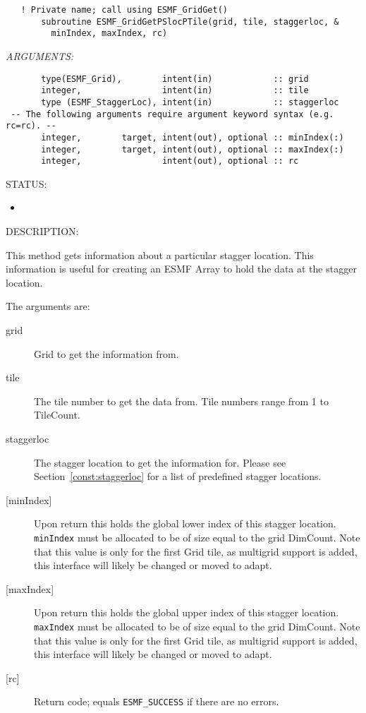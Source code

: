  
\begin{verbatim}   ! Private name; call using ESMF_GridGet()
       subroutine ESMF_GridGetPSlocPTile(grid, tile, staggerloc, &
         minIndex, maxIndex, rc)
 \end{verbatim}{\em ARGUMENTS:}
\begin{verbatim}       type(ESMF_Grid),        intent(in)            :: grid
       integer,                intent(in)            :: tile
       type (ESMF_StaggerLoc), intent(in)            :: staggerloc
 -- The following arguments require argument keyword syntax (e.g. rc=rc). --
       integer,        target, intent(out), optional :: minIndex(:)
       integer,        target, intent(out), optional :: maxIndex(:)
       integer,                intent(out), optional :: rc\end{verbatim}
{\sf STATUS:}
   \begin{itemize}
   \item{}
   \end{itemize}
  
{\sf DESCRIPTION:\\ }


    This method gets information about a particular stagger location.
    This information is useful for creating an ESMF Array to hold
    the data at the stagger location.
  
  The arguments are:
  \begin{description}
  \item[grid]
      Grid to get the information from.
  \item[tile]
       The tile number to get the data from. Tile numbers range from 1 to TileCount.
  \item[staggerloc]
       The stagger location to get the information for.
       Please see Section~\ref{const:staggerloc} for a list
       of predefined stagger locations.
  \item[{[minIndex]}]
       Upon return this holds the global lower index of this stagger location.
       {\tt minIndex} must be allocated to be of size equal to the grid DimCount.
       Note that this value is only for the first Grid tile, as multigrid support
       is added, this interface will likely be changed or moved to adapt.
  \item[{[maxIndex]}]
       Upon return this holds the global upper index of this stagger location.
       {\tt maxIndex} must be allocated to be of size equal to the grid DimCount.
       Note that this value is only for the first Grid tile, as multigrid support
       is added, this interface will likely be changed or moved to adapt.
  \item[{[rc]}]
       Return code; equals {\tt ESMF\_SUCCESS} if there are no errors.
  \end{description}
   
